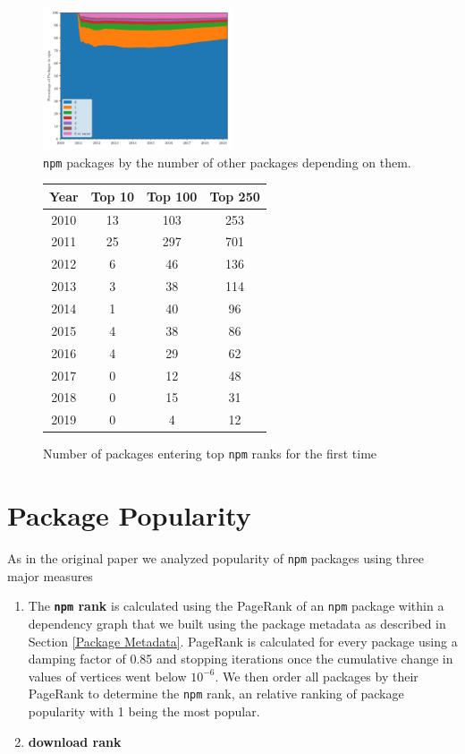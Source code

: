 \documentclass[10pt,conference]{IEEEtran}
\def\code#1{\texttt{#1}}
\begin{document}
\begin{figure}
  \includegraphics[width=0.5\textwidth]{figures/npm_deps_monthly_in_degree.pdf}
  \caption{\code{npm} packages by the number of other packages depending on them.}
  \label{inDegree}
\end{figure}



\begin{figure}
  \begin{tabular}{c|c|c|c}
    Year & Top 10 & Top 100 & Top 250 \\
    \hline
    2010 & 13 & 103 & 253\\
    2011 & 25 & 297 & 701\\
    2012 & 6 & 46 & 136\\
    2013 & 3 & 38 & 114\\
    2014 & 1 & 40 & 96\\
    2015 & 4 & 38 & 86\\
    2016 & 4 & 29 & 62\\
    2017 & 0 & 12 & 48\\
    2018 & 0 & 15 & 31\\
    2019 & 0 & 4 & 12\\
  \end{tabular}
  \caption{Number of packages entering top \code{npm} ranks for the first time}
  \label{numEnteringTop}
\end{figure}

\section{Package Popularity}

As in the original paper we analyzed popularity of \code{npm} packages using three major measures
\begin{enumerate}
  \item The \textbf{\code{npm} rank} is calculated using the PageRank\cite{brin1998anatomy} of an \code{npm} package within a dependency graph that we built using the
    package metadata as described in Section \ref{Package Metadata}. PageRank is calculated for every package using a damping factor of 0.85 
    and stopping iterations once the cumulative change in values of vertices went below $10^{-6}$. We then order all packages by their PageRank to determine the
    \code{npm} rank, an relative ranking of package popularity with 1 being the most popular.
  \item \textbf{download rank}
\end{enumerate}
\end{document}
